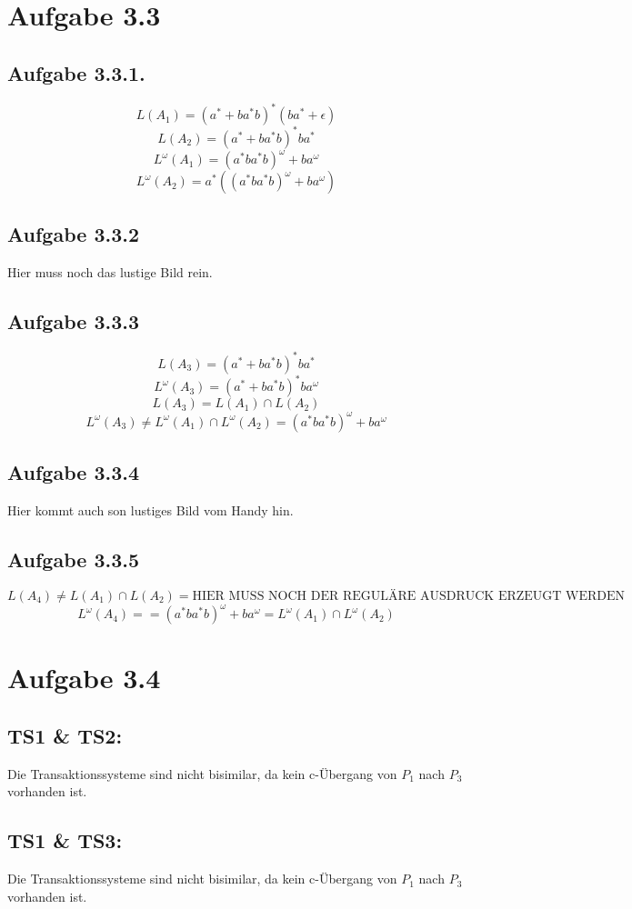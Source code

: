 \documentclass[10pt,a4paper]{article}
\author{Alina Bombeck, Pedram Mehdizadeh Taheri, Sebastian Döbel}
\title{}
\renewcommand{\o}{\omega}
\begin{document}
\section*{Aufgabe 3.3}
\subsection*{Aufgabe 3.3.1.}
\[L(A_1)=(a^* +ba^*b)^* (ba^*+\epsilon)\]
\[L(A_2)=(a^*+ba^*b)^* ba^* \]
\[L^\o(A_1) = (a^*ba^*b)^\o +ba^\o\]
\[L^\o(A_2) = a^*((a^*ba^*b)^\o + ba^\o) \]

\subsection*{Aufgabe 3.3.2}
Hier muss noch das lustige Bild rein.

\subsection*{Aufgabe 3.3.3}
\[L(A_3)=(a^*+ba^*b)^*ba^*\]
\[L^\o(A_3)=(a^*+ba^*b)^*ba^\o\]
\[L(A_3) = L(A_1)\cap L(A_2) \]
\[L^\o(A_3) \neq L^\o(A_1)\cap  L^\o(A_2) = (a^*ba^*b)^\o + ba^\o\] 

\subsection*{Aufgabe 3.3.4}
Hier kommt auch son lustiges Bild vom Handy hin.

\subsection*{Aufgabe 3.3.5}

\[L(A_4) \neq L(A_1)\cap L(A_2) = \text{HIER MUSS NOCH DER REGULÄRE AUSDRUCK ERZEUGT WERDEN}\]
\[L^\o(A_4) = = (a^*ba^*b)^\o + ba^\o = L^\o(A_1)\cap L^\o(A_2)\]


\newpage
\section*{Aufgabe 3.4}

\subsection*{TS1 \& TS2:}
Die Transaktionssysteme sind nicht bisimilar, da kein c-Übergang von $P_{1}$ nach $P_{3}$ vorhanden ist.

\subsection*{TS1 \& TS3:}
Die Transaktionssysteme sind nicht bisimilar, da kein c-Übergang von $P_{1}$ nach $P_{3}$ vorhanden ist.
\end{document}
